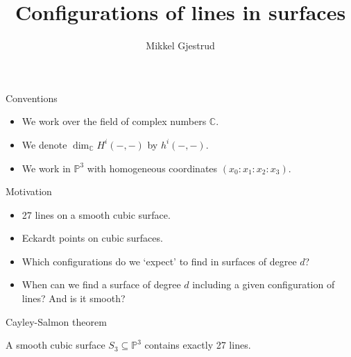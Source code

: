 \documentclass[UKenglish,aspectratio=169]{beamer}
\title{Configurations of lines in surfaces}
\author{Mikkel Gjestrud}
\begin{document}
\uiofrontpage[
    date={12th December, 2025},
]

\begin{frame}{Conventions}
    \begin{itemize}
        \item We work over the field of complex numbers $\mathbb{C}$.
        \item We denote $\dim_\mathbb{C} H^i(-,-)$ by $h^i(-,-)$.
        \item We work in $\mathbb{P}^3$ with homogeneous coordinates $(x_0 : x_1 : x_2 : x_3)$.
    \end{itemize}
\end{frame}

\begin{frame}{Motivation}
    \begin{itemize}
        \item 27 lines on a smooth cubic surface.
        \item Eckardt points on cubic surfaces.
        \item Which configurations do we `expect' to find in surfaces of degree $d$?
        \item When can we find a surface of degree $d$ including a given configuration of lines? And is it smooth?
    \end{itemize}
\end{frame}

\begin{frame}{Cayley-Salmon theorem}
    \begin{theorem}
        A smooth cubic surface $S_3 \subseteq \mathbb{P}^3$ contains exactly 27 lines.
    \end{theorem}
    
\end{frame}
\end{document}
